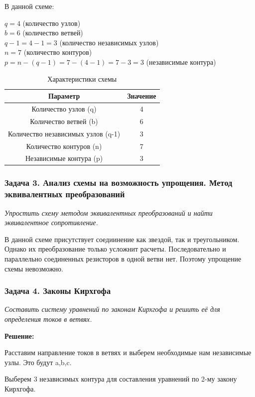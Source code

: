 В данной схеме:
\begin{flushleft}
$q = 4$ (количество узлов) \\
$b = 6$ (количество ветвей) \\
$q-1 = 4-1 = 3$ (количество независимых узлов) \\
$n = 7$ (количество контуров) \\
$p = n-(q-1) = 7-(4-1) = 7-3 = 3$ (независимые контура)
\end{flushleft}

\begin{table}[H]
\centering
\begin{tabular}{|c|c|}
\hline
\textbf{Параметр} & \textbf{Значение} \\
\hline
Количество узлов (q) & 4 \\
\hline
Количество ветвей (b) & 6 \\
\hline
Количество независимых узлов (q-1) & 3 \\
\hline
Количество контуров (n) & 7 \\
\hline
Независимые контура (p) & 3 \\
\hline
\end{tabular}
\caption{Характеристики схемы}
\label{tab:circuit_characteristics}
\end{table}


\subsubsection{Задача 3. Анализ схемы на возможность упрощения. Метод эквивалентных преобразований}
\textit{Упростить схему методом эквивалентных преобразований и найти эквивалентное сопротивление.}

В данной схеме присутствует соедиинение как звездой, так и треугольником. Однако их преобразование только усложнит расчеты. Последовательно и параллельно соединенных резисторов в одной ветви нет. Поэтому упрощение схемы невозможно.


\subsubsection{Задача 4. Законы Кирхгофа}
\textit{Составить систему уравнений по законам Кирхгофа и решить её для определения токов в ветвях.}

\textbf{Решение:}

Расставим направление токов в ветвях и выберем необходимые нам независимые узлы. Это будут a,b,c.

Выберем 3 независимых контура для составления уравнений по 2-му закону Кирхгофа.

